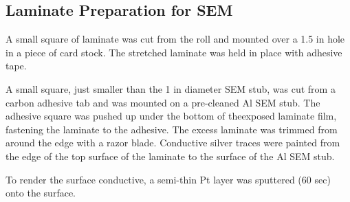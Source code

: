 \subsection{Laminate Preparation for SEM}

A small square of laminate was cut from the roll and
mounted over a 1.5 in hole in a piece of card stock.
The stretched laminate was held in place with adhesive
tape.

A small square, just smaller than the 1 in diameter SEM
stub, was cut from a carbon adhesive tab and was mounted
on a pre-cleaned Al SEM stub. The adhesive square was pushed
up under the bottom of theexposed laminate film, fastening the
laminate to the adhesive. The excess laminate was trimmed from
around the edge with a razor blade. Conductive silver traces
were painted from the edge of the top surface of the
laminate to the surface of the Al SEM stub.

To render the surface conductive, a semi-thin Pt
layer was sputtered (60 sec) onto the surface.

\endinput
